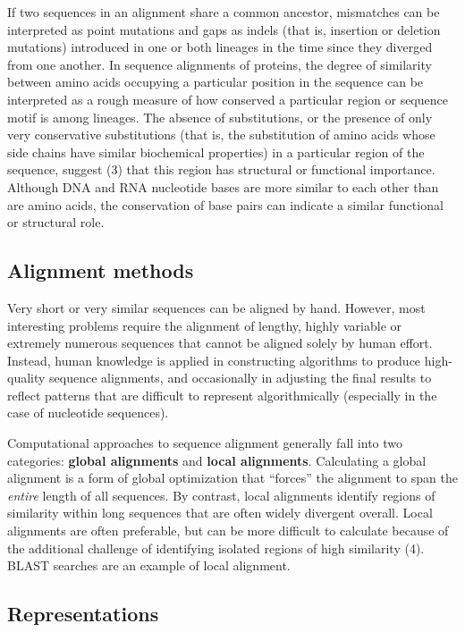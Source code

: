 \documentclass[
]{book}
\begin{document}
If two sequences in an alignment share a common ancestor, mismatches can be interpreted as point mutations and gaps as indels (that is, insertion or deletion mutations) introduced in one or both lineages in the time since they diverged from one another. In sequence alignments of proteins, the degree of similarity between amino acids occupying a particular position in the sequence can be interpreted as a rough measure of how conserved a particular region or sequence motif is among lineages. The absence of substitutions, or the presence of only very conservative substitutions (that is, the substitution of amino acids whose side chains have similar biochemical properties) in a particular region of the sequence, suggest (3) that this region has structural or functional importance. Although DNA and RNA nucleotide bases are more similar to each other than are amino acids, the conservation of base pairs can indicate a similar functional or structural role.

\hypertarget{alignment-methods}{%
\subsection{Alignment methods}\label{alignment-methods}}

Very short or very similar sequences can be aligned by hand. However, most interesting problems require the alignment of lengthy, highly variable or extremely numerous sequences that cannot be aligned solely by human effort. Instead, human knowledge is applied in constructing algorithms to produce high-quality sequence alignments, and occasionally in adjusting the final results to reflect patterns that are difficult to represent algorithmically (especially in the case of nucleotide sequences).

Computational approaches to sequence alignment generally fall into two categories: \textbf{global alignments} and \textbf{local alignments}. Calculating a global alignment is a form of global optimization that ``forces'' the alignment to span the \emph{entire} length of all sequences. By contrast, local alignments identify regions of similarity within long sequences that are often widely divergent overall. Local alignments are often preferable, but can be more difficult to calculate because of the additional challenge of identifying isolated regions of high similarity (4). BLAST searches are an example of local alignment.

\hypertarget{representations}{%
\subsection{Representations}\label{representations}}
\end{document}
